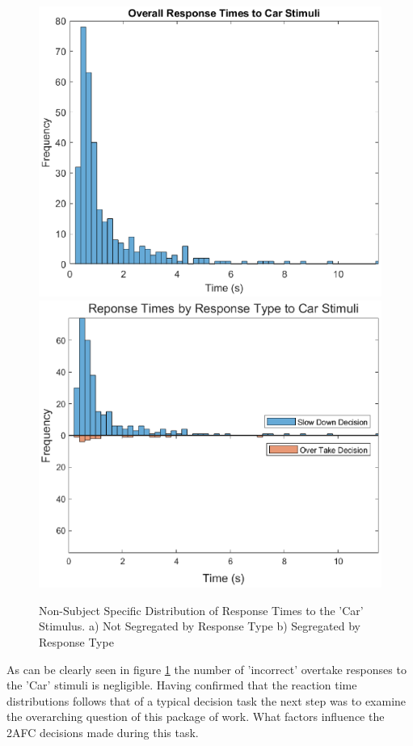 \begin{figure}[H]
    \centering
    \includegraphics[width=0.37\paperwidth]{figures/CarReactionTimes.eps}
    \includegraphics[width=0.37\paperwidth]{figures/CarReactionTimes2.eps}
    \caption{Non-Subject Specific Distribution of Response Times to the 'Car' Stimulus. a) Not Segregated by Response Type b) Segregated by Response Type}
    \label{fig:RT_C}
\end{figure}

As can be clearly seen in figure \ref{fig:RT_C} the number of 'incorrect' overtake responses to the 'Car' stimuli is negligible. Having confirmed that the reaction time distributions follows that of a typical decision task the next step was to examine the overarching question of this package of work. What factors influence the 2AFC decisions made during this task.

